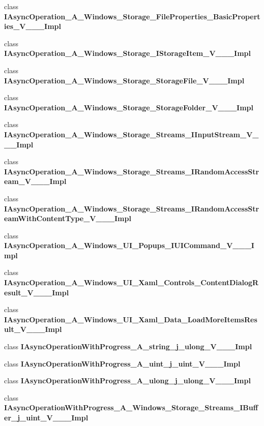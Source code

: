 \begin{DoxyCompactItemize}
\item 
class {\bfseries I\+Async\+Operation\+\_\+\+A\+\_\+\+Windows\+\_\+\+Storage\+\_\+\+File\+Properties\+\_\+\+Basic\+Properties\+\_\+\+V\+\_\+\+\_\+\+\_\+\+Impl}
\item 
class {\bfseries I\+Async\+Operation\+\_\+\+A\+\_\+\+Windows\+\_\+\+Storage\+\_\+\+I\+Storage\+Item\+\_\+\+V\+\_\+\+\_\+\+\_\+\+Impl}
\item 
class {\bfseries I\+Async\+Operation\+\_\+\+A\+\_\+\+Windows\+\_\+\+Storage\+\_\+\+Storage\+File\+\_\+\+V\+\_\+\+\_\+\+\_\+\+Impl}
\item 
class {\bfseries I\+Async\+Operation\+\_\+\+A\+\_\+\+Windows\+\_\+\+Storage\+\_\+\+Storage\+Folder\+\_\+\+V\+\_\+\+\_\+\+\_\+\+Impl}
\item 
class {\bfseries I\+Async\+Operation\+\_\+\+A\+\_\+\+Windows\+\_\+\+Storage\+\_\+\+Streams\+\_\+\+I\+Input\+Stream\+\_\+\+V\+\_\+\+\_\+\+\_\+\+Impl}
\item 
class {\bfseries I\+Async\+Operation\+\_\+\+A\+\_\+\+Windows\+\_\+\+Storage\+\_\+\+Streams\+\_\+\+I\+Random\+Access\+Stream\+\_\+\+V\+\_\+\+\_\+\+\_\+\+Impl}
\item 
class {\bfseries I\+Async\+Operation\+\_\+\+A\+\_\+\+Windows\+\_\+\+Storage\+\_\+\+Streams\+\_\+\+I\+Random\+Access\+Stream\+With\+Content\+Type\+\_\+\+V\+\_\+\+\_\+\+\_\+\+Impl}
\item 
class {\bfseries I\+Async\+Operation\+\_\+\+A\+\_\+\+Windows\+\_\+\+U\+I\+\_\+\+Popups\+\_\+\+I\+U\+I\+Command\+\_\+\+V\+\_\+\+\_\+\+\_\+\+Impl}
\item 
class {\bfseries I\+Async\+Operation\+\_\+\+A\+\_\+\+Windows\+\_\+\+U\+I\+\_\+\+Xaml\+\_\+\+Controls\+\_\+\+Content\+Dialog\+Result\+\_\+\+V\+\_\+\+\_\+\+\_\+\+Impl}
\item 
class {\bfseries I\+Async\+Operation\+\_\+\+A\+\_\+\+Windows\+\_\+\+U\+I\+\_\+\+Xaml\+\_\+\+Data\+\_\+\+Load\+More\+Items\+Result\+\_\+\+V\+\_\+\+\_\+\+\_\+\+Impl}
\item 
class {\bfseries I\+Async\+Operation\+With\+Progress\+\_\+\+A\+\_\+string\+\_\+j\+\_\+ulong\+\_\+\+V\+\_\+\+\_\+\+\_\+\+Impl}
\item 
class {\bfseries I\+Async\+Operation\+With\+Progress\+\_\+\+A\+\_\+uint\+\_\+j\+\_\+uint\+\_\+\+V\+\_\+\+\_\+\+\_\+\+Impl}
\item 
class {\bfseries I\+Async\+Operation\+With\+Progress\+\_\+\+A\+\_\+ulong\+\_\+j\+\_\+ulong\+\_\+\+V\+\_\+\+\_\+\+\_\+\+Impl}
\item 
class {\bfseries I\+Async\+Operation\+With\+Progress\+\_\+\+A\+\_\+\+Windows\+\_\+\+Storage\+\_\+\+Streams\+\_\+\+I\+Buffer\+\_\+j\+\_\+uint\+\_\+\+V\+\_\+\+\_\+\+\_\+\+Impl}

\end{DoxyCompactItemize}
